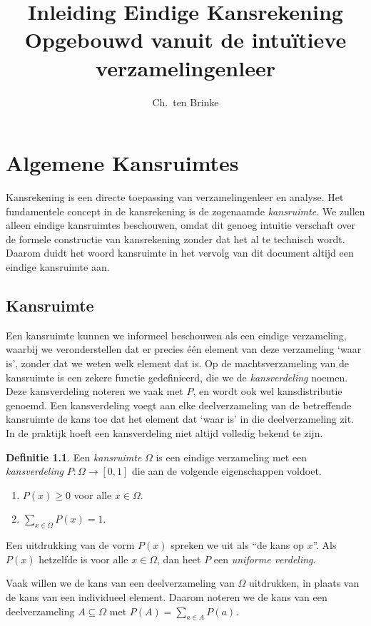 \documentclass[a4paper]{book}
\title{Inleiding Eindige Kansrekening \\ \small{Opgebouwd vanuit de intu\"itieve verzamelingenleer}}
\author{Ch.\ ten Brinke}
\theoremstyle{definition}
\newtheorem{definition}[theorem]{Definitie}
\begin{document}
\maketitle

\chapter{Algemene Kansruimtes}
Kansrekening is een directe toepassing van verzamelingenleer en analyse.
Het fundamentele concept in de kansrekening is de zogenaamde \emph{kansruimte}.
We zullen alleen eindige kansruimtes beschouwen, omdat dit genoeg intuitie verschaft over de formele constructie van kansrekening zonder dat het al te
technisch wordt.
Daarom duidt het woord kansruimte in het vervolg van dit document altijd een eindige kansruimte aan.



\section{Kansruimte}
Een kansruimte kunnen we informeel beschouwen als een eindige verzameling, waarbij we veronderstellen dat er precies \'e\'en element van deze verzameling `waar is', zonder dat we weten welk element dat is.
Op de machtsverzameling van de kansruimte is een zekere functie gedefinieerd, die we de \emph{kansverdeling} noemen.
Deze kansverdeling noteren we vaak met $P$, en wordt ook wel kansdistributie genoemd.
Een kansverdeling voegt aan elke deelverzameling van de betreffende kansruimte de kans toe dat het element dat `waar is' in die deelverzameling zit.
In de praktijk hoeft een kansverdeling niet altijd volledig bekend te zijn.

\begin{definition}
    Een \emph{kansruimte} $\Omega$ is een eindige verzameling met een \emph{kansverdeling} $P: \Omega \to [0,1]$  die aan de volgende eigenschappen voldoet.
    \begin{enumerate}[i]
        \item $P(x) \geq 0$ voor alle $x \in \Omega$.
        \item $\sum_{x \in \Omega}P(x) = 1$.
    \end{enumerate}

    Een uitdrukking van de vorm $P(x)$ spreken we uit als ``de kans op $x$''.
    Als $P(x)$ hetzelfde is voor alle $x\in \Omega$, dan heet $P$ een \emph{uniforme verdeling}.

    Vaak willen we de kans van een deelverzameling van $\Omega$ uitdrukken, in plaats van de kans van een individueel element.
    Daarom noteren we de kans van een deelverzameling $A \subseteq \Omega$ met $P(A) = \sum_{a \in A} P(a)$.
\end{definition}
\end{document}
